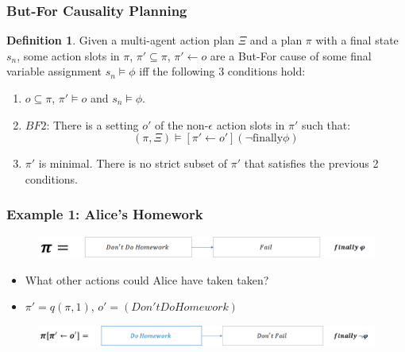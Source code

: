\documentclass{beamer}
\theoremstyle{plain}
\theoremstyle{definition}
\newtheorem{defn}[thm]{Definition} %
\begin{document}
\begin{frame}
\frametitle{But-For Causality Planning}
\begin{defn} 

Given a multi-agent action plan $\Xi$ and a plan $\pi$ with a final state $s_n$, some action slots in $\pi$, $\pi' \subseteq \pi$, $\pi' \leftarrow o$ are a But-For cause of some final variable assignment $s_n \models \phi$ iff the following 3 conditions hold:
\begin{enumerate}
\item  $o \subseteq \pi$, $\pi' \models o$ and $s_n \models \phi$.
\item $BF2$: There is a setting $o'$ of the non-$\epsilon$ action slots in $\pi'$ such that:
\[
(\pi, \Xi) \models [\pi' \leftarrow o'](\lnot \textrm{finally} \phi)
\]
\item $\pi'$ is minimal. There is no strict subset of $\pi'$ that satisfies the previous 2 conditions.
\end{enumerate}


\end{defn}

\end{frame}
\begin{frame}
\frametitle{Example 1: Alice's Homework}
\begin{figure}
\includegraphics[scale=.35]{alicePlan}
\end{figure}

\begin{itemize}
\item What other actions could Alice have taken taken?
\item $\pi'= q(\pi,1)$, $o'=(Don't Do Homework)$
\end{itemize}

\begin{figure}
\includegraphics[scale=.35]{alicePlanCounterfactual}
\end{figure}
\end{frame}
\end{document}
